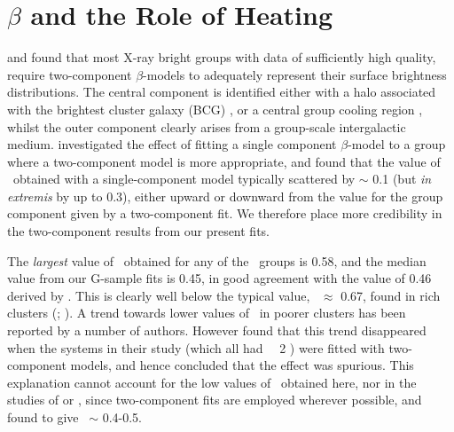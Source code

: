 \documentclass[usenatbib]{mn2e}
\begin{document}

\section{$\beta$ and the Role of Heating}
\label{sec_beta}

\citet{mulchaey98} and \citet{helsdon00a} found that most X-ray bright groups
with data of sufficiently high quality, require two-component $\beta$-models to
adequately represent their surface brightness distributions.  The central
component is identified either with a halo associated with the brightest cluster
galaxy (BCG) \citep{mulchaey98}, or a central group cooling region
\citep{helsdon03b}, whilst the outer component clearly arises from a group-scale
intergalactic medium.  \citet{helsdon00a} investigated the effect of fitting a
single component $\beta$-model to a group where a two-component model is more
appropriate, and found that the value of \betafit\ obtained with a
single-component model typically scattered by $\sim$ 0.1 (but {\it in extremis}
by up to 0.3), either upward or downward from the value for the group component
given by a two-component fit. We therefore place more credibility in the
two-component results from our present fits.

The {\it largest} value of \betafit\ obtained for any of the \GEMS\ groups is 0.58,
and the median value from our G-sample fits is 0.45, in good agreement with the
value of 0.46 derived by \citet{helsdon00a}.  This is clearly well below the
typical value, \betafit\ $\approx$ 0.67, found in rich clusters
(\citealt{arnaud99}; \citealt*{mohr99}).  A trend towards lower values of
\betafit\ in poorer clusters has been  reported by a number of authors. However
\citet{mohr99} found that this trend disappeared when the systems in their study
(which all had \TX\ \gtsim\ 2 \kev)  were fitted with two-component models, and
hence concluded that the effect was spurious.  This explanation cannot account
for the low values of \betafit\ obtained here, nor in the studies of
\citet{helsdon00a} or \citet{mulchaey03}, since two-component fits are employed
wherever possible, and found to give \betafit\ $\sim$ 0.4-0.5. 
\end{document}
